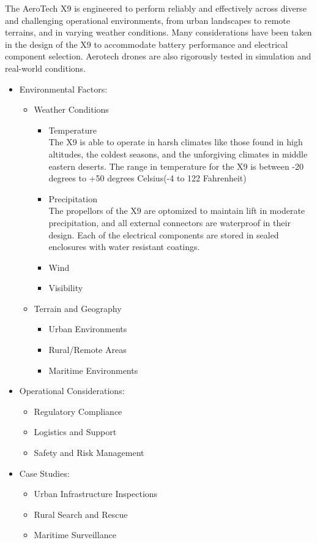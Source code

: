 The AeroTech X9 is engineered to perform reliably and effectively across diverse and challenging operational environments, from urban landscapes to remote terrains, and in varying weather conditions. Many considerations have been taken in the design of the X9 to accommodate battery performance and electrical component selection. Aerotech drones are also rigorously tested in simulation and real-world conditions.  \\
\begin{itemize}
    \item Environmental Factors:
    \begin{itemize}
        \item Weather Conditions
        \begin{itemize}
            \item Temperature \\
            The X9 is able to operate in harsh climates like those found in high altitudes, the coldest seasons, and the unforgiving climates in middle eastern deserts. The range in temperature for the X9 is between -20 degrees to +50 degrees Celsius(-4 to 122 Fahrenheit)
            \item Precipitation
            \\
            The propellors of the X9 are optomized to maintain lift in moderate precipitation, and all external connectors are waterproof in their design. Each of the electrical components are stored in sealed enclosures with water resistant coatings. 
            \item Wind
            \\
            
            \item Visibility
        \end{itemize}
        \item Terrain and Geography
        \begin{itemize}
            \item Urban Environments
            \item Rural/Remote Areas
            \item Maritime Environments
        \end{itemize}
    \end{itemize}
    \item Operational 
    Considerations:
    \begin{itemize}
        \item Regulatory Compliance
        \item Logistics and Support
        \item Safety and Risk Management
    \end{itemize}
    \item Case Studies:
    \begin{itemize}
        \item Urban Infrastructure Inspections
        \item Rural Search and Rescue
        \item Maritime Surveillance    
    \end{itemize}
\end{itemize}
